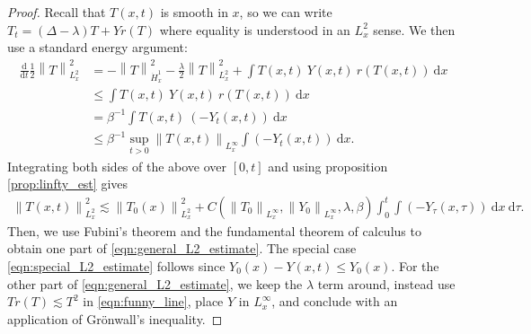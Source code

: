\documentclass[10pt,a4paper]{amsart}
\newcommand{\diff}{\mathrm{d}}
\begin{document}
\begin{proof}
    Recall that $T(x,t)$ is smooth in $x$, so we can write
    $T_{t} = \left(\Delta-\lambda\right) T + Yr\left(T\right)$
    where equality is understood in an $L^2_x$ sense. We then use a standard energy argument:  
    \begin{align}
    \frac{\diff}{\diff t}\frac12\left\|T\right\|_{L^2_{x}}^2 &= - \left\|T\right\|^2_{\dot{H}^1_{x}} -\frac{\lambda}{2}\left\|T\right\|^2_{L^2_x}+ \int T(x,t) \ Y(x,t) \ r\left(T(x,t)\right) \ \diff x \nonumber
    \\
    &\leq  \int T(x,t) \ Y(x,t) \ r\left(T(x,t)\right) \ \diff x \label{eqn:funny_line}
    \\
    &= \beta^{-1} \int T(x,t) \ \left(-Y_{t}(x,t)\right) \ \diff x \nonumber
    \\
    &\leq \beta^{-1}\sup_{t>0}\left\|T(x,t)\right\|_{L^{\infty}_{x}}\int  \left(-Y_{t}(x,t)\right) \ \diff x. \nonumber
    \end{align}
    Integrating both sides of the above over $[0,t]$ and using proposition \ref{prop:linfty_est} gives 
    \begin{align*}
        \left\|T(x,t)\right\|_{L^2_{x}}^2 \lesssim \left\|T_0(x)\right\|_{L^2_{x}}^2 + C\left(\left\|T_0\right\|_{L^{\infty}_{x}}, \left\|Y_0\right\|_{ L^{\infty}_{x}}, \lambda, \beta\right)\int_0^t\int \left(-Y_{\tau}(x,\tau)\right) \ \diff x \ \diff \tau.
    \end{align*}
    Then, we use Fubini's theorem and the fundamental theorem of calculus to obtain one part of \eqref{eqn:general_L2_estimate}. The special case \eqref{eqn:special_L2_estimate} follows since $Y_0(x) - Y(x,t) \leq Y_0(x)$. For the other part of \eqref{eqn:general_L2_estimate}, we keep the $\lambda$ term around, instead use $Tr(T)\lesssim T^2$ in \eqref{eqn:funny_line}, place $Y$ in $L^{\infty}_{x}$, and conclude with an application of Gr\"{o}nwall's inequality. 
\end{proof}
\end{document}
